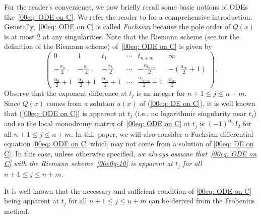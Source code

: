 \documentclass[11pt]{article}
\numberwithin{equation}{section}
\numberwithin{equation}{section}
\begin{document}
For the reader's convenience, we now briefly recall some basic notions
of ODEs like~\eqref{00eq: ODE on C}. We refer the reader to
\cite{Yoshida,Whittaker-Watson} for a comprehensive
introduction. Generally,~\eqref{00eq: ODE on C} is called
\emph{Fuchsian} because the pole order of $Q(x)$ is at most $2$ at any
singularities.
Note that the Riemann scheme (see \cite[p.~11]{Yoshida} for the definition of the Riemann scheme) of~\eqref{00eq: ODE on C} is
 given by
\begin{equation}\label{00e0q-10}\begin{pmatrix}
0&1&t_1&\cdots& t_{n+m}&\infty\\
-\frac{{\alpha}_0}{2} &-\frac{{\alpha}_1}{2}&-\frac{{\alpha}_{t_1}}{2}&\cdots&-\frac{{\alpha}_{t_{n+m}}}{2}&-(\frac{{\alpha}_\infty}{2}+1)\\
\frac{{\alpha}_0}{2}+1&\frac{{\alpha}_1}{2}+1&\frac{{\alpha}_{t_1}}{2}+1&\cdots&\frac{{\alpha}_{t_{n+m}}}{2}+1&\frac{{\alpha}_\infty}{2}
\end{pmatrix}.\end{equation}
Observe that the exponent difference at $t_j$ is an integer for
$n+1\leq j\leq n+m$.
Since $Q(x)$ comes from a solution $u(x)$ of (\ref{00eq: DE on C}), it is well known that
(\ref{00eq: ODE on C}) is apparent at $t_j$ \big(i.e., no logarithmic
singularity near $t_j$\big) and so
the local monodromy matrix of~\eqref{00eq: ODE on C} at $t_j$ is
$(-1)^{{\alpha}_{t_j}}I_2$ for all $n+1\leq j\leq n+m$.
In this paper, we will also consider a Fuchsian differential equation
\eqref{00eq: ODE on C} which may not come from a solution of
\eqref{00eq: DE on C}. In this case, unless otherwise specified,
\emph{we always assume that~\eqref{00eq: ODE on C} with the Riemann
 scheme~\eqref{00e0q-10} is apparent at $t_j$ for all $n+1\leq j\leq
 n+m$}.

It is well known that the necessary and sufficient condition of
\eqref{00eq: ODE on C} being apparent at $t_j$ for all $n+1\leq j\leq
n+m$ can be derived from the Frobenius method.
\end{document}
